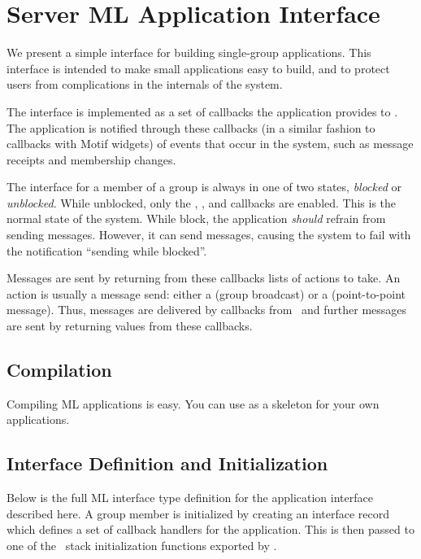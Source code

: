%
%
%
\section{Server ML Application Interface}
\label{section:applintf}

We present a simple interface for building single-group applications.  This
interface is intended to make small applications easy to build, and to protect
users from complications in the internals of the system.

The interface is implemented as a set of callbacks the application
provides to \ensemble.  The application is notified through these
callbacks (in a similar fashion to callbacks with Motif widgets) of
events that occur in the system, such as message receipts and
membership changes.

The interface for a member of a group is always in one of two states,
\emph{blocked} or \emph{unblocked}.  While unblocked, only the
, , and 
callbacks are enabled.  This is the normal state of the system. While
block, the application \emph{should} refrain from sending messages. However,
it can send messages, causing the system to fail with the notification
``sending while blocked''.

Messages are sent by returning from these callbacks lists of actions to
take.  An action is usually a message send: either a  (group
broadcast) or a  (point-to-point message).  Thus, messages are
delivered by callbacks from \ensemble\ and further messages are sent by
returning values from these callbacks.

\subsection{Compilation}
Compiling ML applications is easy.  You can use  as a
skeleton for your own applications.

\subsection{Interface Definition and Initialization}
Below is the full ML interface type definition for the application
interface described here.  A group member is initialized by creating
an interface record which defines a set of callback handlers for the
application.  This is then passed to one of the \ensemble\ stack
initialization functions exported by .


